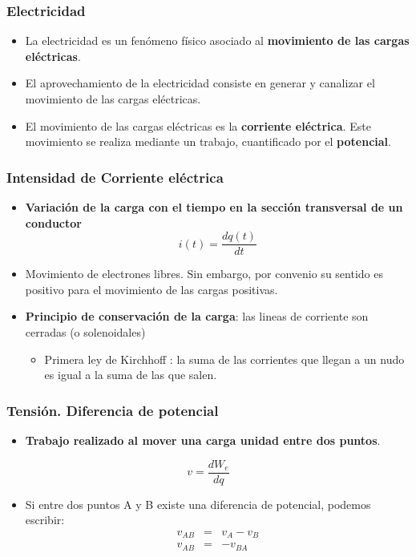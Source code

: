 \documentclass[serif, xcolor=dvipsnames]{beamer}
\begin{document}
\begin{frame}
  \frametitle{Electricidad}
  \begin{itemize}
  \item La electricidad es un fenómeno físico asociado al
    \textbf{movimiento de las cargas eléctricas}.
  \item El aprovechamiento de la electricidad consiste en generar y
    canalizar el movimiento de las cargas eléctricas.
  \item El movimiento de las cargas eléctricas es la \textbf{corriente
      eléctrica}.  Este movimiento se realiza mediante un trabajo,
    cuantificado por el \textbf{potencial}.
  \end{itemize}

\end{frame}
\begin{frame}
  \frametitle{Intensidad de Corriente eléctrica}
  \begin{itemize}
  \item \textbf{Variación de la carga con el tiempo en la sección
      transversal de un conductor}
    \[
    i(t)=\frac{dq(t)}{dt}
    \]

  \item Movimiento de electrones libres. Sin embargo, por convenio su
    sentido es positivo para el movimiento de las cargas positivas.
  \item \textbf{Principio de conservación de la carga}: las lineas de
    corriente son cerradas (o solenoidales)

    \begin{itemize}
    \item Primera ley de Kirchhoff : la suma de las corrientes que
      llegan a un nudo es igual a la suma de las que salen.
    \end{itemize}
  \end{itemize}

\end{frame}
\begin{frame}
  \frametitle{Tensión. Diferencia de potencial}
  \begin{itemize}
  \item \textbf{Trabajo realizado al mover una carga unidad entre dos
      puntos}.
  \end{itemize}
  \[
  v=\frac{dW_{e}}{dq}
  \]

  \begin{itemize}
  \item Si entre dos puntos A y B existe una diferencia de potencial,
    podemos escribir:
    \begin{eqnarray*}
      v_{AB} & = & v_{A}-v_{B}\\
      v_{AB} & = & -v_{BA}
    \end{eqnarray*}

  \end{itemize}

\end{frame}
\end{document}
